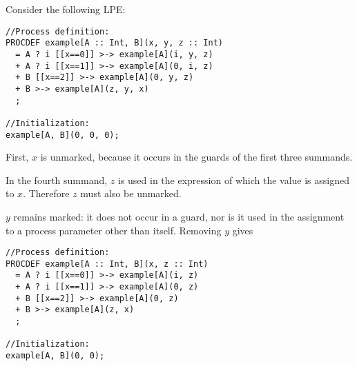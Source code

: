 Consider the following LPE:

\begin{lstlisting}
//Process definition:
PROCDEF example[A :: Int, B](x, y, z :: Int)
  = A ? i [[x==0]] >-> example[A](i, y, z)
  + A ? i [[x==1]] >-> example[A](0, i, z)
  + B [[x==2]] >-> example[A](0, y, z)
  + B >-> example[A](z, y, x)
  ;

//Initialization:
example[A, B](0, 0, 0);
\end{lstlisting}

First, $x$ is unmarked, because it occurs in the guards of the first three summands.

In the fourth summand, $z$ is used in the expression of which the value is assigned to $x$.
Therefore $z$ must also be unmarked.

$y$ remains marked: it does not occur in a guard, nor is it used in the assignment to a process parameter other than itself.
Removing $y$ gives

\begin{lstlisting}
//Process definition:
PROCDEF example[A :: Int, B](x, z :: Int)
  = A ? i [[x==0]] >-> example[A](i, z)
  + A ? i [[x==1]] >-> example[A](0, z)
  + B [[x==2]] >-> example[A](0, z)
  + B >-> example[A](z, x)
  ;

//Initialization:
example[A, B](0, 0);
\end{lstlisting}



